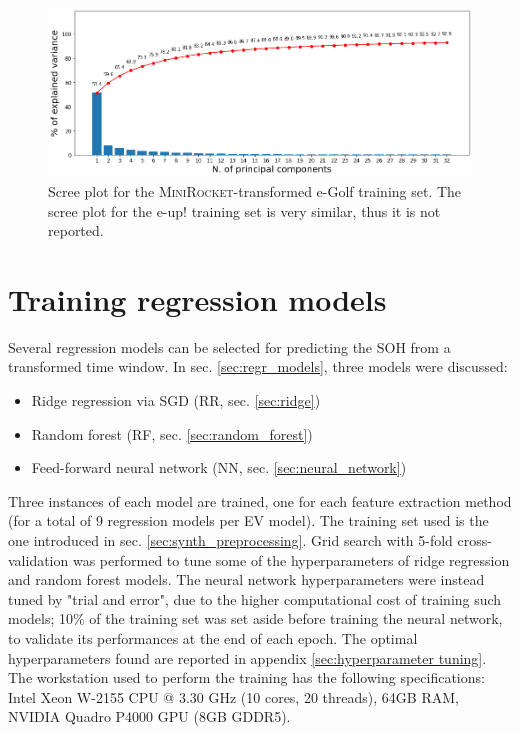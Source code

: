 \begin{figure}[hbt!]
    \centering
    \includegraphics[width=\textwidth]{images/scree_plot}
    \caption[Scree plot for the \textsc{MiniRocket}-transformed e-Golf training set]{Scree plot for the \textsc{MiniRocket}-transformed e-Golf training set. The scree plot for the e-up! training set is very similar, thus it is not reported.}
    \label{fig:scree_plot}
\end{figure}




\section{Training regression models}
\label{sec:regr_model_training}
Several regression models can be selected for predicting the SOH from a transformed time window. In sec. \ref{sec:regr_models}, three models were discussed:
\begin{itemize}
    \item Ridge regression via SGD (RR, sec. \ref{sec:ridge})
    \item Random forest (RF, sec. \ref{sec:random_forest})
    \item Feed-forward neural network (NN, sec. \ref{sec:neural_network})
\end{itemize}
Three instances of each model are trained, one for each feature extraction method (for a total of 9 regression models per EV model). The training set used is the one introduced in sec. \ref{sec:synth_preprocessing}. Grid search with 5-fold cross-validation was performed to tune some of the hyperparameters of ridge regression and random forest models. The neural network hyperparameters were instead tuned by "trial and error", due to the higher computational cost of training such models; 10\% of the training set was set aside before training the neural network, to validate its performances at the end of each epoch. The optimal hyperparameters found are reported in appendix \ref{sec:hyperparameter tuning}. The workstation used to perform the training has the following specifications: Intel Xeon W-2155 CPU @ 3.30 GHz (10 cores, 20 threads), 64GB RAM, NVIDIA Quadro P4000 GPU (8GB GDDR5).

